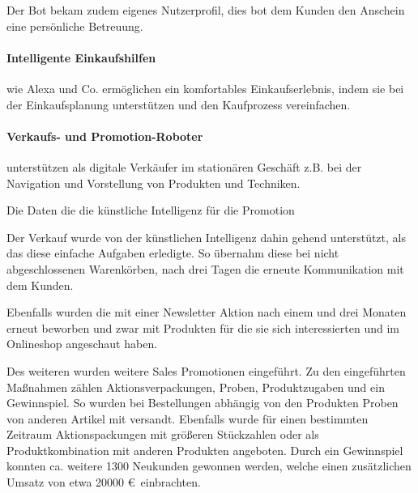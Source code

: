 Der Bot bekam zudem eigenes Nutzerprofil, dies bot dem Kunden den Anschein eine persönliche Betreuung.

\paragraph{Intelligente Einkaufshilfen} wie Alexa und Co. ermöglichen ein komfortables Einkaufserlebnis, indem sie bei der Einkaufsplanung unterstützen und den Kaufprozess vereinfachen.

\paragraph{Verkaufs- und Promotion-Roboter} unterstützen als digitale Verkäufer im stationären Geschäft z.B. bei der Navigation und Vorstellung von Produkten und Techniken.\vspace{0.2cm}

Die Daten die die künstliche Intelligenz für die Promotion 

Der Verkauf wurde von der künstlichen Intelligenz dahin gehend unterstützt, als das diese einfache Aufgaben erledigte. So übernahm diese bei nicht abgeschlossenen Warenkörben, nach drei Tagen die erneute Kommunikation mit dem Kunden.\vspace{0.2cm}

Ebenfalls wurden die mit einer Newsletter Aktion nach einem und drei Monaten erneut beworben und zwar mit Produkten für die sie sich interessierten und im Onlineshop angeschaut haben.\vspace{0.2cm}

Des weiteren wurden weitere Sales Promotionen eingeführt. Zu den eingeführten Maßnahmen zählen Aktionsverpackungen, Proben, Produktzugaben und ein Gewinnspiel. So wurden bei Bestellungen abhängig von den Produkten Proben von anderen Artikel mit versandt. Ebenfalls wurde für einen bestimmten Zeitraum Aktionspackungen mit größeren Stückzahlen oder als Produktkombination mit anderen Produkten angeboten. Durch ein Gewinnspiel konnten ca. weitere 1300 Neukunden gewonnen werden, welche einen zusätzlichen Umsatz von etwa 20000 \euro \, einbrachten.

